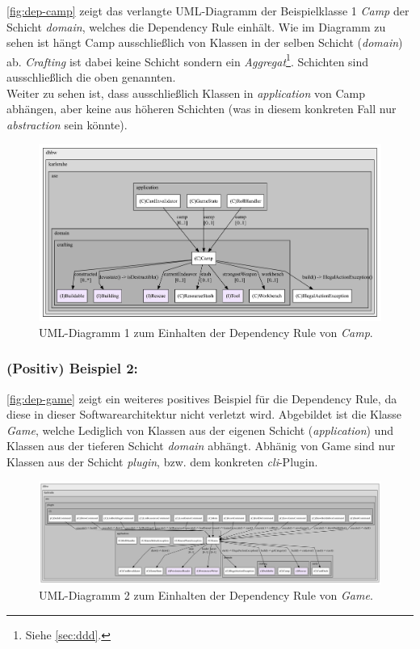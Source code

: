 \autoref{fig:dep-camp} zeigt das verlangte UML-Diagramm der Beispielklasse 1 \textit{Camp} der Schicht \textit{domain}, 
welches die Dependency Rule einhält. Wie im Diagramm zu sehen ist hängt Camp ausschließlich von 
Klassen in der selben Schicht (\textit{domain}) ab. 
\textit{Crafting} ist dabei keine Schicht sondern ein \textit{Aggregat}\footnote{Siehe \autoref{sec:ddd}.}. 
Schichten sind ausschließlich die oben genannten. \\ 
Weiter zu sehen ist, dass ausschließlich Klassen in \textit{application} von Camp abhängen, aber keine 
aus höheren Schichten (was in diesem konkreten Fall nur \textit{abstraction} sein könnte).

\begin{figure}[H]
	\centering
	\includegraphics[width=1.\textwidth]{Bilder/Camp_structure.pdf} 
	\caption{UML-Diagramm 1 zum Einhalten der Dependency Rule von \textit{Camp}. }
	\label{fig:dep-camp}
\end{figure} 

\subsubsection{(Positiv) Beispiel 2:}

\autoref{fig:dep-game} zeigt ein weiteres positives Beispiel für die Dependency Rule, 
da diese in dieser Softwarearchitektur nicht verletzt wird. Abgebildet ist die Klasse \textit{Game}, 
welche Lediglich von Klassen aus der eigenen Schicht (\textit{application}) und Klassen aus der tieferen 
Schicht \textit{domain} abhängt. Abhänig von Game sind nur Klassen aus der Schicht \textit{plugin},
bzw. dem konkreten \textit{cli}-Plugin. 

\begin{figure}[H]
	\centering
	\includegraphics[width=1.05\textwidth]{Bilder/Game_structure.pdf} 
	\caption{UML-Diagramm 2 zum Einhalten der Dependency Rule von \textit{Game}. }
	\label{fig:dep-game}
\end{figure} 


